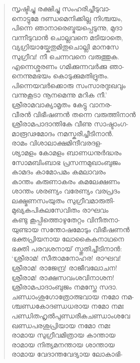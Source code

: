 \begin{verse}
സൃഷ്ടിച്ചു രക്ഷിച്ചു സംഹരിച്ചീടുവാ-\\
നൊട്ടുമേ ദണ്ഡമെനിക്കില്ല നിശ്ചയം,\\
പിന്നെ ഞാനാരെബ്ഭയപ്പെടുന്നു, മുദാ\\
വന്നീടുവാന്‍ ചൊല്ലവനെ മടിയാതെ,\\
വ്യഗ്രിയായ്കേതുമിതുചൊല്ലി മാനസേ\\
സുഗ്രീവ! നീ ചെന്നവനെ വരുത്തുക.\\
എന്നെശ്ശരണം ഗമിക്കുന്നവര്‍ക്കു ഞാ-\\
നെന്നുമഭയം കൊടുക്കുമതിദ്രുതം.\\
പിന്നെയവര്‍ക്കൊരു സംസാരദുഃഖവും\\
വന്നുകൂടാ നൂനമെന്നു മറിക നീ.’\\
ശ്രീരാമവാക്യാമൃതം കേട്ടു വാനര-\\
വീരന്‍ വിഭീഷണന്‍ തന്നെ വരുത്തിനാന്‍\\
ശ്രീരാമപാദാന്തികേ വീണു സാഷ്ടാംഗ-\\
മാരൂഢമോദം നമസ്കരിച്ചീടിനാന്‍.\\
രാമം വിശാലാക്ഷമിന്ദീവരദള-\\
ശ്യാമളം കോമളം ബാണധനുര്‍ദ്ധരം\\
സോമബിംബാഭ പ്രസന്നമുഖാംബുജം\\
കാമദം കാമോപമം കമലാവരം\\
കാന്തം കരുണാകരം കമലേക്ഷണം\\
ശാന്തം ശരണ്യം വരേണ്യം വരപ്രദം\\
ലക്ഷ്മണസംയുതം സുഗ്രീവമാരുതി-\\
മുഖ്യകപികുലസേവിതം രാഘവം\\
കണ്ടു കൂപ്പിത്തൊഴുതേറ്റം വിനീതനാ-\\
യുണ്ടായ സന്തോഷമോടും വിഭീഷണന്‍\\
ഭക്തപ്രിയനായ ലോകൈകനാഥനെ\\
ഭക്തി പരവശനായ് സ്തുതിച്ചീടിനാന്‍:\\
‘ശ്രീരാമ! സീതാമനോഹര! രാഘവ!\\
ശ്രീരാമ! രാജേന്ദ്ര! രാജീവലോചന!\\
ശ്രീരാമ! രാക്ഷസവംശവിനാശന!\\
ശ്രീരാമപാദാംബുജം നമസ്തേ സദാ.\\
ചണ്ഡാംശുഗോത്രോത്ഭവായ നമോ നമ-\\
ശ്ചണ്ഡകോദണ്ഡധരായ നമോ നമഃ\\
പണ്ഡിതഹൃല്‍പുണ്ഡരീകചണ്ഡാംശവേ\\
ഖണ്ഡപരശുപ്രിയായ നമോ നമഃ\\
രാമായ സുഗ്രീവമിത്രായ കാന്തായ\\
രാമായ നിത്യമനന്തായ ശാന്തായ\\
രാമായ വേദാന്തവേദ്യായ ലോകാഭി-\\

\end{verse}
